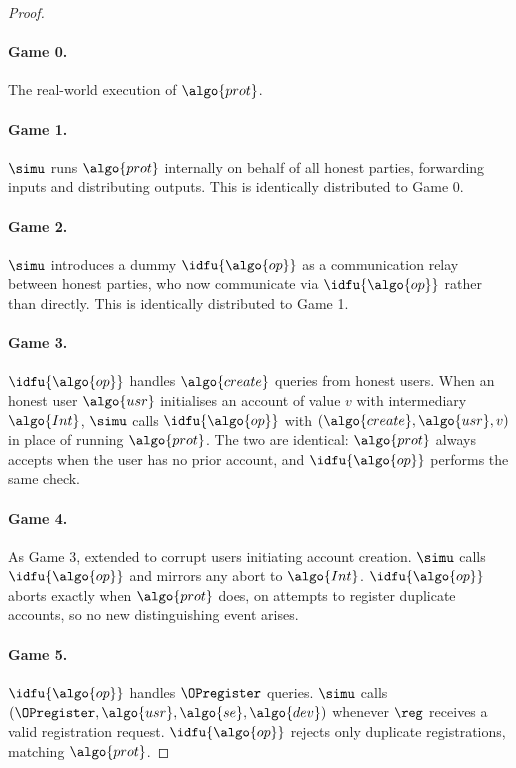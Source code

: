 \begin{proof}

\paragraph{Game 0.} The real-world execution of $\algo{prot}$.

\paragraph{Game 1.} $\simu$ runs $\algo{prot}$ internally on behalf of all
honest parties, forwarding inputs and distributing outputs. This is identically
distributed to Game 0.

\paragraph{Game 2.} $\simu$ introduces a dummy $\idfu{\algo{op}}$ as a communication
relay between honest parties, who now communicate via $\idfu{\algo{op}}$ rather than
directly.  This is identically distributed to Game 1.

\paragraph{Game 3.} $\idfu{\algo{op}}$ handles $\algo{create}$ queries from honest
users. When an honest user $\algo{usr}$ initialises an account of value $v$
with intermediary $\algo{Int}$, $\simu$ calls $\idfu{\algo{op}}$ with $(\algo{create},
\algo{usr}, v)$ in place of running $\algo{prot}$. The two are identical:
$\algo{prot}$ always accepts when the user has no prior account, and $\idfu{\algo{op}}$
performs the same check.

\paragraph{Game 4.} As Game 3, extended to corrupt users initiating account
creation. $\simu$ calls $\idfu{\algo{op}}$ and mirrors any abort to $\algo{Int}$.
$\idfu{\algo{op}}$ aborts exactly when $\algo{prot}$ does, on attempts to register
duplicate accounts, so no new distinguishing event arises.

\paragraph{Game 5.} $\idfu{\algo{op}}$ handles $\OPregister$ queries. $\simu$ calls
$(\OPregister, \algo{usr}, \algo{se}, \algo{dev})$ whenever $\reg$ receives
a valid registration request. $\idfu{\algo{op}}$ rejects only duplicate registrations,
matching $\algo{prot}$.


\end{proof}
